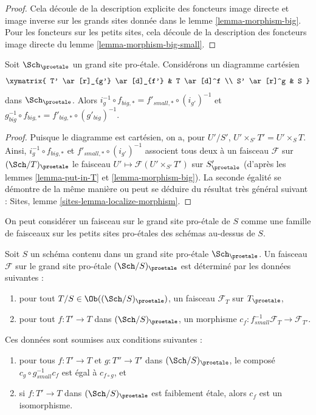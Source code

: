 \begin{proof}
Cela découle de la description explicite des foncteurs image directe
et image inverse sur les grands sites donnée dans le
lemme \ref{lemma-morphism-big}. Pour les foncteurs
sur les petits sites, cela découle de la description des
foncteurs image directe du lemme \ref{lemma-morphism-big-small}.
\end{proof}

\begin{lemma}
\label{lemma-morphism-big-small-cartesian-diagram}
Soit $\Sch_\proetale$ un grand site pro-\'etale. Considérons un diagramme cartésien
$$
\xymatrix{
T' \ar[r]_{g'} \ar[d]_{f'} & T \ar[d]^f \\
S' \ar[r]^g & S
}
$$
dans $\Sch_\proetale$. Alors
$i_g^{-1} \circ f_{big, *} = f'_{small, *} \circ (i_{g'})^{-1}$
et $g_{big}^{-1} \circ f_{big, *} = f'_{big, *} \circ (g'_{big})^{-1}$.
\end{lemma}

\begin{proof}
Puisque le diagramme est cartésien, on a, pour $U'/S'$,
$U' \times_{S'} T' = U' \times_S T$. Ainsi,
$i_g^{-1} \circ f_{big, *}$ et $f'_{small, *} \circ (i_{g'})^{-1}$
associent tous deux à un faisceau $\mathcal{F}$ sur $(\Sch/T)_\proetale$ le faisceau
$U' \mapsto \mathcal{F}(U' \times_{S'} T')$ sur $S'_\proetale$
(d'après les lemmes \ref{lemma-put-in-T} et \ref{lemma-morphism-big}).
La seconde égalité se démontre de la même manière ou peut se
déduire du résultat très général suivant :
Sites, lemme \ref{sites-lemma-localize-morphism}.
\end{proof}

\noindent
On peut considérer un faisceau sur le grand site pro-\'etale de $S$ comme une famille
de faisceaux sur les petits sites pro-\'etales des schémas au-dessus de $S$.

\begin{lemma}
\label{lemma-characterize-sheaf-big}
Soit $S$ un schéma contenu dans un grand site pro-\'etale $\Sch_\proetale$.
Un faisceau $\mathcal{F}$ sur le grand site pro-\'etale $(\Sch/S)_\proetale$
est déterminé par les données suivantes :
\begin{enumerate}
\item pour tout $T/S \in \Ob((\Sch/S)_\proetale)$, un faisceau
$\mathcal{F}_T$ sur $T_\proetale$,
\item pour tout $f : T' \to T$ dans
$(\Sch/S)_\proetale$, un morphisme
$c_f : f_{small}^{-1}\mathcal{F}_T \to \mathcal{F}_{T'}$.
\end{enumerate}
Ces données sont soumises aux conditions suivantes :
\begin{enumerate}
\item[(a)] pour tous $f : T' \to T$ et $g : T'' \to T'$ dans
$(\Sch/S)_\proetale$, le composé
$c_g \circ g_{small}^{-1}c_f$ est égal à $c_{f \circ g}$, et
\item[(b)] si $f : T' \to T$ dans $(\Sch/S)_\proetale$
est faiblement \'etale, alors $c_f$ est un isomorphisme.
\end{enumerate}
\end{lemma}

